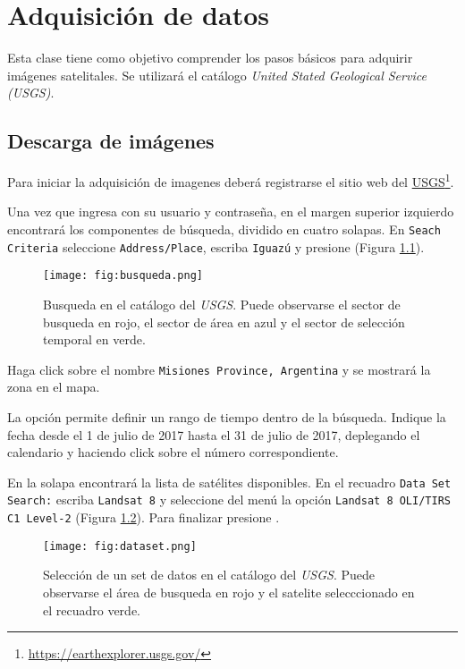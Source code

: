 \chapter{Adquisición de datos}

Esta clase tiene como objetivo comprender los pasos básicos para adquirir imágenes satelitales. Se utilizará el catálogo \emph{United Stated Geological Service (USGS)}.

\section{Descarga de imágenes}

Para iniciar la adquisición de imagenes deberá registrarse el sitio web del \href{https://earthexplorer.usgs.gov/}{USGS}\footnote{\href{https://earthexplorer.usgs.gov/}{https://earthexplorer.usgs.gov/}}.

Una vez que ingresa con su usuario y contraseña, en el margen superior izquierdo encontrará los componentes de búsqueda, dividido en cuatro solapas. En \texttt{Seach Criteria} seleccione \texttt{Address/Place}, escriba \texttt{Iguazú} y presione  (Figura \ref{fig:busqueda}).

\begin{figure}[h!]
    \centering
    \texttt{[image: fig:busqueda.png]}
    \caption{Busqueda en el catálogo del \emph{USGS}. Puede observarse el sector de busqueda en rojo, el sector de área en azul y el sector de selección temporal en verde.}
    \label{fig:busqueda}
\end{figure}

Haga click sobre el nombre \texttt{Misiones Province, Argentina} y se mostrará la zona en el mapa.

La opción  permite definir un rango de tiempo dentro de la búsqueda. Indique la fecha desde el 1 de julio de 2017 hasta el 31 de julio de 2017, deplegando el calendario y haciendo click sobre el número correspondiente.

En la solapa  encontrará la lista de satélites disponibles. En el recuadro \texttt{Data Set Search:} escriba \texttt{Landsat 8} y seleccione del menú la opción \texttt{Landsat 8 OLI/TIRS C1 Level-2} (Figura \ref{fig:dataset}). Para finalizar presione .

\begin{figure}[h!]
    \centering
    \texttt{[image: fig:dataset.png]}
    \caption{Selección de un set de datos en el catálogo del \emph{USGS}. Puede observarse el área de busqueda en rojo y el satelite selecccionado en el recuadro verde.}
    \label{fig:dataset}
\end{figure}

